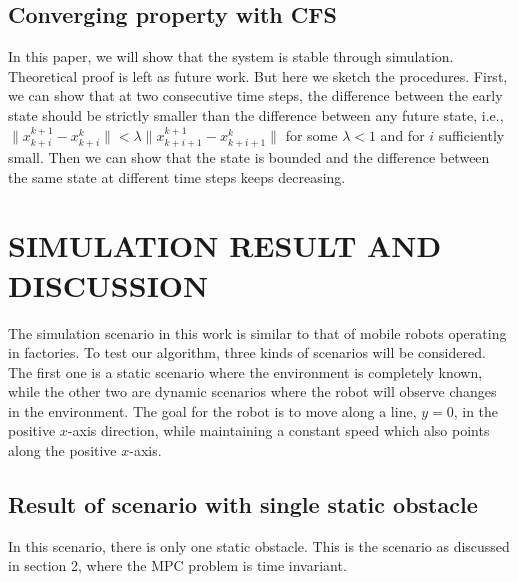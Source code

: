 \documentclass[letterpaper, 10 pt, conference]{ieeeconf}  %
\begin{document}
\subsection{Converging property with CFS}
In this paper, we will show that the system is stable through simulation. Theoretical proof is left as future work. But here we sketch the procedures. First, we can show that at two consecutive time steps, the difference between the early state should be strictly smaller than the difference between any future state, i.e., $\|x_{k+i}^{k+1}-x_{k+i}^k\|<\lambda\|x_{k+i+1}^{k+1}-x_{k+i+1}^k\|$ for some $\lambda<1$ and for $i$ sufficiently small. Then we can show that the state is bounded and the difference between the same state at different time steps keeps decreasing.
%
%


\section{SIMULATION RESULT AND DISCUSSION}
The simulation scenario in this work is similar to that of mobile robots operating in factories. To test our algorithm, three kinds of scenarios will be considered. The first one is a static scenario where the environment  is completely known, while the other two are dynamic scenarios where the robot will observe changes in the environment.
The goal for the robot is to move along a line, $y=0$, in the positive $x$-axis direction, while maintaining a constant speed which also points along the positive $x$-axis. 


\subsection{Result of scenario with single static obstacle}
In this scenario, there is only one static obstacle. This is the scenario as discussed in section 2, where the MPC problem is time invariant. 
\end{document}
